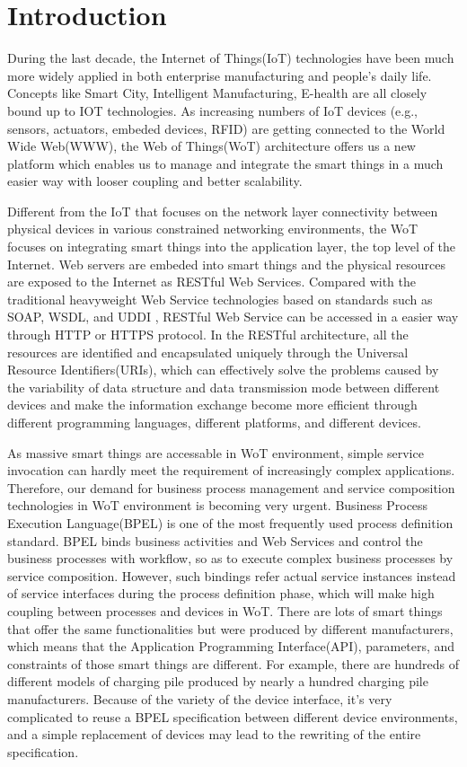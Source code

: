 \section{Introduction}
\label{Introduction}
During the last decade, the Internet of Things(IoT) technologies have been much more widely applied in both enterprise manufacturing and people's daily life. Concepts like Smart City, Intelligent Manufacturing, E-health are all closely bound up to IOT technologies. As increasing numbers of IoT devices (e.g., sensors, actuators, embeded devices, RFID) are getting connected to the World Wide Web(WWW)\cite{guinard2011internet}, the Web of Things(WoT) architecture offers us a new platform which enables us to manage and integrate the smart things in a much easier way with looser coupling and better scalability. 

Different from the IoT that focuses on the network layer connectivity between physical devices in various constrained networking environments, the WoT focuses on integrating smart things into the application layer, the top level of the Internet. Web servers are embeded into smart things and the physical resources are exposed to the Internet as RESTful Web Services\cite{guinard2010resource}. Compared with the traditional heavyweight Web Service technologies based on standards such as SOAP, WSDL, and UDDI , RESTful Web Service can be accessed in a easier way through HTTP or HTTPS protocol. In the RESTful architecture, all the resources are identified and  encapsulated uniquely through the Universal Resource Identifiers(URIs), which can effectively solve the problems caused by the variability of data structure and data transmission mode between different devices and make the information exchange become more efficient through different programming languages, different platforms, and different devices\cite{pautasso2008restful}.  

As massive smart things are accessable in WoT environment, simple service invocation can hardly meet the requirement of increasingly complex applications. Therefore, our demand for business process management and service composition technologies in WoT environment is becoming very urgent. Business Process Execution Language(BPEL) is one of the most frequently used process definition standard\cite{jordan2003web}. BPEL binds business activities and Web Services and control the business processes with workflow, so as to execute complex business processes by service composition. However, such bindings refer actual service instances instead of service  interfaces during the process definition phase, which will make high coupling between processes and devices in WoT. There are lots of smart things that offer the same functionalities but were produced by different manufacturers, which means that the Application Programming Interface(API), parameters, and constraints of those smart things are different. For example, there are hundreds of different models of charging pile produced by nearly a hundred charging pile manufacturers. Because of the variety of the device interface, it's very complicated to reuse a BPEL specification between different device environments, and a simple replacement of devices may lead to the rewriting of the entire specification. 

